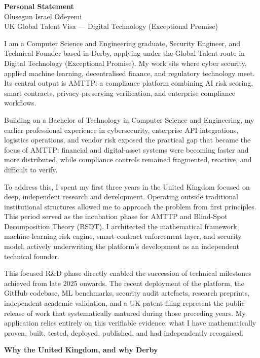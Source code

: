\documentclass[12pt,a4paper]{article}
\begin{document}
\begin{center}
{\Large\bfseries Personal Statement}\\[4pt]
{\large Olusegun Israel Odeyemi}\\[2pt]
{\normalsize UK Global Talent Visa --- Digital Technology (Exceptional Promise)}
\end{center}

\bigskip

I am a Computer Science and Engineering graduate, Security Engineer, and Technical Founder based in Derby, applying under the Global Talent route in Digital Technology (Exceptional Promise). My work sits where cyber security, applied machine learning, decentralised finance, and regulatory technology meet. Its central output is AMTTP: a compliance platform combining AI risk scoring, smart contracts, privacy-preserving verification, and enterprise compliance workflows.

Building on a Bachelor of Technology in Computer Science and Engineering, my earlier professional experience in cybersecurity, enterprise API integrations, logistics operations, and vendor risk exposed the practical gap that became the focus of AMTTP: financial and digital-asset systems were becoming faster and more distributed, while compliance controls remained fragmented, reactive, and difficult to verify.

To address this, I spent my first three years in the United Kingdom focused on deep, independent research and development. Operating outside traditional institutional structures allowed me to approach the problem from first principles. This period served as the incubation phase for AMTTP and Blind-Spot Decomposition Theory (BSDT). I architected the mathematical framework, machine-learning risk engine, smart-contract enforcement layer, and security model, actively underwriting the platform's development as an independent technical founder.

This focused R\&D phase directly enabled the succession of technical milestones achieved from late 2025 onwards. The recent deployment of the platform, the GitHub codebase, ML benchmarks, security audit artefacts, research preprints, independent academic validation, and a UK patent filing represent the public release of work that systematically matured during those preceding years. My application relies entirely on this verifiable evidence: what I have mathematically proven, built, tested, deployed, published, and had independently recognised.

\textbf{Why the United Kingdom, and why Derby}
\end{document}
